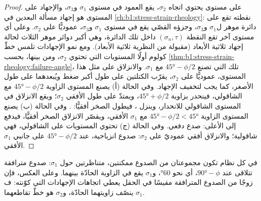 \begin{proof}
على مستوى يحتوي اتجاه $\sigma_2$، يقع العمود في مستوى $\sigma_1$ و$\sigma_3$، والإجهاد على المستوى هو إجهاد مسألة البعدين في \cref{ch:b1:stress-strain-rheology}: نقطته تقع على دائرة موهر ل$\sigma_1$ و$\sigma_3$، وجزؤه القصّي يقع في مستوى $\sigma_1$ و$\sigma_3$، عموديًّا على $\sigma_2$. وعلى أي مستوى آخر تقع النقطة $(\sigma_n, \tau)$ داخل تلك الدائرة، وهي أكبر دوائر موهر الثلاث لحالة إجهاد ثلاثية الأبعاد (مقبولة من النظرية ثلاثية الأبعاد). ومع نمو الإجهادات تلمس خطّ كولوم أولًا المستويات التي تحتوي $\sigma_2$، ومن بينها، بحسب \cref{thm:b1:stress-strain-rheology:failure-angle}، تلك التي تصنع $\ang{45} - \phi/2$ مع $\sigma_1$. والانزلاق على مثل هذا المستوى، عموديًّا على $\sigma_2$، يقرّب الكتلتين على طول أكبر ضغط ويُبعدهما على طول الأصغر، كما يجب لتخفيف الإجهاد. وفي الحالة (أ) يصنع المستوى الزاوية $\ang{45} - \phi/2$ مع الشاقولي، فينحدر بزاوية $\ang{45} + \phi/2$، ويمتدّ على طول الأفقي $\sigma_2$؛ ويقع الانزلاق في المستوى الشاقولي للانحدار، وينزل ، فيطول الصخر أفقيًّا: . وفي الحالة (ب) يصنع المستوى الزاوية $\ang{45} - \phi/2 < \ang{45}$ مع $\sigma_1$ الأفقي، ويقصّر الانزلاق الصخر أفقيًّا، فيدفع  إلى الأعلى: صدع دفعي. وفي الحالة (ج) تحتوي المستويات على الشاقولي، فهي شاقولية؛ والانزلاق أفقي عموديّ على $\sigma_2$: صدوع انزياحية، عند $\ang{45} - \phi/2$ على جانبي $\sigma_1$ الأفقي.
\end{proof}

في كل نظام تكون مجموعتان من الصدوع ممكنتين، متناظرتين حول $\sigma_1$: صدوع مترافقة تتلاقى عند $\ang{90} - \phi$، أي نحو \ang{60}، و$\sigma_1$ يقع في الزاوية الحادّة بينهما. وعلى العكس، فإن زوجًا من الصدوع المترافقة مقيسًا في الحقل يعطي اتجاهات الإجهادات التي كوّنته: ف$\sigma_1$ ينصّف زاويتهما الحادّة، و$\sigma_2$ هو خطّ تقاطعهما.

